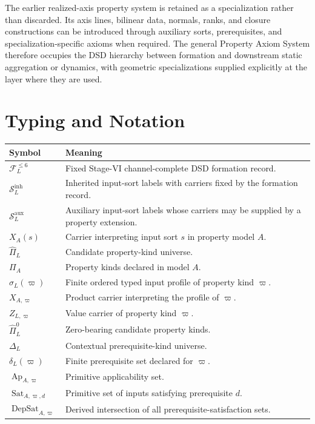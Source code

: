 \documentclass[11pt]{article}
\newcommand{\FVI}{\mathcal F_{L}^{\le 6}}
\newcommand{\Sin}{\mathcal S_{L}^{\mathrm{inh}}}
\newcommand{\Saux}{\mathcal S_{L}^{\mathrm{aux}}}
\newcommand{\Pihat}{\widehat{\Pi}_{L}}
\newcommand{\PiZero}{\widehat{\Pi}_{L}^{0}}
\newcommand{\Dep}{\Delta_{L}}
\newcommand{\Ap}{\operatorname{Ap}}
\newcommand{\DepSat}{\operatorname{DepSat}}
\newcommand{\Sat}{\operatorname{Sat}}
\theoremstyle{definition}
\theoremstyle{remark}
\begin{document}
The earlier realized-axis property system is retained as a specialization rather than discarded.
Its axis lines, bilinear data, normals, ranks, and closure constructions can be introduced through auxiliary sorts, prerequisites, and specialization-specific axioms when required.
The general Property Axiom System therefore occupies the DSD hierarchy between formation and downstream static aggregation or dynamics, with geometric specializations supplied explicitly at the layer where they are used.

\appendix
\section{Typing and Notation}
\label{app:notation}

\begin{tabularx}{\textwidth}{@{}>{\raggedright\arraybackslash}p{}X@{}}
\toprule
Symbol & Meaning\\
\midrule
\(\FVI\) & Fixed Stage-VI channel-complete DSD formation record.\\
\(\Sin\) & Inherited input-sort labels with carriers fixed by the formation record.\\
\(\Saux\) & Auxiliary input-sort labels whose carriers may be supplied by a property extension.\\
\(X_A(s)\) & Carrier interpreting input sort \(s\) in property model \(A\).\\
\(\Pihat\) & Candidate property-kind universe.\\
\(\Pi_A\) & Property kinds declared in model \(A\).\\
\(\sigma_L(\varpi)\) & Finite ordered typed input profile of property kind \(\varpi\).\\
\(X_{A,\varpi}\) & Product carrier interpreting the profile of \(\varpi\).\\
\(Z_{L,\varpi}\) & Value carrier of property kind \(\varpi\).\\
\(\PiZero\) & Zero-bearing candidate property kinds.\\
\(\Dep\) & Contextual prerequisite-kind universe.\\
\(\delta_L(\varpi)\) & Finite prerequisite set declared for \(\varpi\).\\
\(\Ap_{A,\varpi}\) & Primitive applicability set.\\
\(\Sat_{A,\varpi,d}\) & Primitive set of inputs satisfying prerequisite \(d\).\\
\(\DepSat_{A,\varpi}\) & Derived intersection of all prerequisite-satisfaction sets.\\

\end{tabularx}
\end{document}
